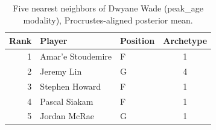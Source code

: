\begin{table}[htbp]
  \centering\small
  \begin{tabular}{rllc}
    \toprule
    Rank & Player & Position & Archetype \\
    \midrule
    1 & Amar'e Stoudemire & F & 1 \\
    2 & Jeremy Lin & G & 4 \\
    3 & Stephen Howard & F & 1 \\
    4 & Pascal Siakam & F & 1 \\
    5 & Jordan McRae & G & 1 \\
    \bottomrule
  \end{tabular}
  \caption{Five nearest neighbors of Dwyane Wade (peak_age modality), Procrustes-aligned posterior mean.}
  \label{tab:Dwyane_Wade_neighbors_peak_age}
\end{table}

